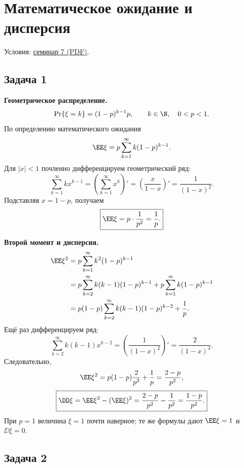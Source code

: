 \section{Математическое ожидание и дисперсия}

\noindent Условия:
\href{run:conditions/sem_07.pdf}{семинар 7 (PDF)}.

\begingroup
\everymath{\textstyle}
\subsection{Задача 1}

\begin{solution}
    \textbf{Геометрическое распределение.}
    \[
        \Pr\{\xi=k\}=(1-p)^{k-1}p,\qquad k\in\N,\quad 0<p<1.
    \]
    По определению математического ожидания
    \[
        \EE\xi=p\sum_{k=1}^{\infty}k(1-p)^{k-1}.
    \]
    Для $|x|<1$ почленно дифференцируем геометрический ряд:
    \[
        \sum_{k=1}^{\infty}kx^{k-1}
        =\left(\sum_{k=1}^{\infty}x^k\right)'
        =\left(\frac{x}{1-x}\right)'
        =\frac1{(1-x)^2}.
    \]
    Подставляя $x=1-p$, получаем
    \[
        \boxed{\EE\xi=p\cdot\frac1{p^2}=\frac1p.}
    \]

    \textbf{Второй момент и дисперсия.}
    \[
        \begin{aligned}
            \EE\xi^2
            &=p\sum_{k=1}^{\infty}k^2(1-p)^{k-1}\\
            &=p\sum_{k=2}^{\infty}k(k-1)(1-p)^{k-1}
              +p\sum_{k=1}^{\infty}k(1-p)^{k-1}\\
            &=p(1-p)\sum_{k=2}^{\infty}k(k-1)(1-p)^{k-2}
              +\frac1p.
        \end{aligned}
    \]
    Ещё раз дифференцируем ряд:
    \[
        \sum_{k=2}^{\infty}k(k-1)x^{k-2}
        =\left(\frac1{(1-x)^2}\right)'
        =\frac2{(1-x)^3}.
    \]
    Следовательно,
    \[
        \EE\xi^2=p(1-p)\frac2{p^3}+\frac1p
        =\frac{2-p}{p^2},
    \]
    \[
        \boxed{\DD\xi=\EE\xi^2-(\EE\xi)^2
        =\frac{2-p}{p^2}-\frac1{p^2}=\frac{1-p}{p^2}.}
    \]
    При $p=1$ величина $\xi=1$ почти наверное; те же формулы дают
    $\EE\xi=1$ и $\DD\xi=0$.
\end{solution}

\clearpage
\subsection{Задача 2}

